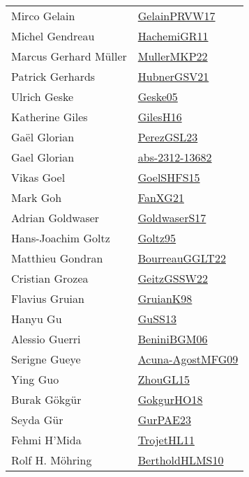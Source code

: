 {\begin{longtable}{p{4cm}p{20cm}}
Mirco Gelain & \href{papers/GelainPRVW17.pdf}{GelainPRVW17}\cite{GelainPRVW17} \\
Michel Gendreau & \href{articles/HachemiGR11.pdf}{HachemiGR11}\cite{HachemiGR11} \\
Marcus Gerhard M{\"{u}}ller & \href{articles/MullerMKP22.pdf}{MullerMKP22}\cite{MullerMKP22} \\
Patrick Gerhards & \href{articles/HubnerGSV21.pdf}{HubnerGSV21}\cite{HubnerGSV21} \\
Ulrich Geske & \href{papers/Geske05.pdf}{Geske05}\cite{Geske05} \\
Katherine Giles & \href{papers/GilesH16.pdf}{GilesH16}\cite{GilesH16} \\
Ga{\"{e}}l Glorian & \href{papers/PerezGSL23.pdf}{PerezGSL23}\cite{PerezGSL23} \\
Gael Glorian & \href{articles/abs-2312-13682.pdf}{abs-2312-13682}\cite{abs-2312-13682} \\
Vikas Goel & \href{articles/GoelSHFS15.pdf}{GoelSHFS15}\cite{GoelSHFS15} \\
Mark Goh & \href{articles/FanXG21.pdf}{FanXG21}\cite{FanXG21} \\
Adrian Goldwaser & \href{papers/GoldwaserS17.pdf}{GoldwaserS17}\cite{GoldwaserS17} \\
Hans{-}Joachim Goltz & \href{papers/Goltz95.pdf}{Goltz95}\cite{Goltz95} \\
Matthieu Gondran & \href{}{BourreauGGLT22}\cite{BourreauGGLT22} \\
Cristian Grozea & \href{papers/GeitzGSSW22.pdf}{GeitzGSSW22}\cite{GeitzGSSW22} \\
Flavius Gruian & \href{papers/GruianK98.pdf}{GruianK98}\cite{GruianK98} \\
Hanyu Gu & \href{papers/GuSS13.pdf}{GuSS13}\cite{GuSS13} \\
Alessio Guerri & \href{papers/BeniniBGM06.pdf}{BeniniBGM06}\cite{BeniniBGM06} \\
Serigne Gueye & \href{papers/Acuna-AgostMFG09.pdf}{Acuna-AgostMFG09}\cite{Acuna-AgostMFG09} \\
Ying Guo & \href{papers/ZhouGL15.pdf}{ZhouGL15}\cite{ZhouGL15} \\
Burak G{\"{o}}kg{\"{u}}r & \href{}{GokgurHO18}\cite{GokgurHO18} \\
Seyda G{\"{u}}r & \href{articles/GurPAE23.pdf}{GurPAE23}\cite{GurPAE23} \\
Fehmi H'Mida & \href{articles/TrojetHL11.pdf}{TrojetHL11}\cite{TrojetHL11} \\
Rolf H. M{\"{o}}hring & \href{papers/BertholdHLMS10.pdf}{BertholdHLMS10}\cite{BertholdHLMS10} \\

\end{longtable}}

